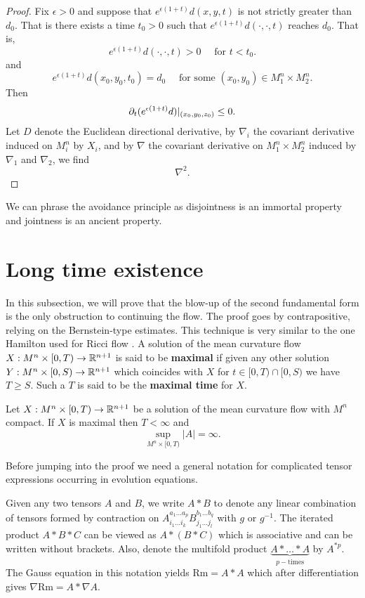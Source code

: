 \begin{proof} Fix $\epsilon > 0$ and suppose that $e ^{\epsilon (1+t)}d(x,y,t)$ is not strictly greater than $d_0$. That is there exists a time $ t_0 > 0$ such that $e^{\epsilon(1+ t)}d(\cdot, \cdot, t)$ reaches $ d_0$. That is,\[
e^{\epsilon(1+t)}d(\cdot,\cdot,t)> 0 \quad \text{ for } t < t_0
.\]  and \[
e^{\epsilon(1+t)}d(x_0,y_0,t_0) = d_0 \quad \text{ for some }(x_0,y_0) \in   M^n_1 \times  M^n_2		
.\] Then \[
\partial_t (e^{\epsilon(1+t)}d)|_{(x_0,y_0,z_0)} \le 0 
.\] Let $D$ denote the Euclidean directional derivative, by $ \nabla_i$ the covariant derivative induced on $M^n_i$ by $X_i$, and by $\nabla $ the covariant derivative on $ M^n_1 \times  M^n_2$ induced by $ \nabla_1$ and $ \nabla_2$, we find \[
\nabla^2
.\] 

\end{proof}
\begin{remark}
We can phrase the avoidance principle as disjointness is an immortal property and jointness is an ancient property.
\end{remark}


\section{Long time existence}

In this subsection, we will prove that the blow-up of the second fundamental form is the only obstruction to continuing the flow. The proof goes by contrapositive, relying on the Bernstein-type estimates. This technique is very similar to the one Hamilton used for Ricci flow \cite{hamilton1982three}. A solution of the mean curvature flow $ X : M^{n} \times [0,T) \to \mathbb{R}^{n+1} $ is said to be \textbf{maximal}  if given any other solution $ Y : M^{n} \times [0,S) \to \mathbb{R}^{n+1} $ which coincides with $ X $ for $ t \in [0,T) \cap [0,S) $ we have $ T \ge S $. Such a $ T $ is said to be the \textbf{maximal time} for $ X $. 

\begin{thm}\label{longtimeexistence}
    Let $ X: M^{n} \times [0, T) \to \mathbb{R}^{n+1} $ be a solution of the mean curvature flow with $ M^{n} $ compact. If $ X $ is maximal then $ T< \infty $ and 
    \[ \sup_{M^{n} \times [0,T)} |A| = \infty.\]
\end{thm}

Before jumping into the proof we need a general notation for complicated tensor expressions occurring in evolution equations. 
\begin{defn}
    Given any two tensors $ A $ and $ B $, we write $ A * B $ to denote any linear combination of tensors formed by contraction on $ A_{i_{1} \dots i_{k}}^{a_{1} \dots a_{p}}B_{j_{1} \dots j_{l}}^{b_{1} \dots b_{q}} $ with $ g $ or $ g^{-1} $. The iterated product $ A * B * C $ can be viewed as $ A * (B * C) $ which is associative and can be written without brackets. Also, denote the multifold product $ \underbrace{A * \dots * A}_{p-\text{times}}$ by $ A^{*p} $. The Gauss equation in this notation yields $ \text{Rm} = A * A $ which after differentiation gives $ \nabla \text{Rm} = A * \nabla A $. 
\end{defn}


